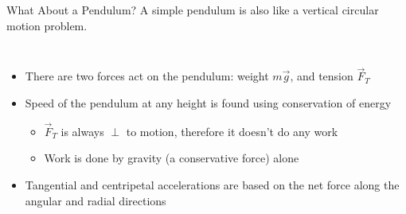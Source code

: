\documentclass[12pt,compress,aspectratio=169]{beamer}
\begin{document}
\begin{frame}{What About a Pendulum?}
  A simple pendulum is also like a vertical circular motion problem.

  \vspace{.1in}
  \begin{columns}

    \begin{itemize}
    \item There are two forces act on the pendulum: weight $m\vec g$, and
    tension $\vec F_T$
    \item Speed of the pendulum at any height is found using conservation
      of energy
      \begin{itemize}
      \item $\vec F_T$ is always $\perp$ to motion, therefore it doesn't
        do any work
      \item Work is done by gravity (a conservative force) alone
      \end{itemize}
    \item Tangential and centripetal accelerations are based on the net force
      along the angular and radial directions
    \end{itemize}
  \end{columns}
\end{frame}
\end{document}
